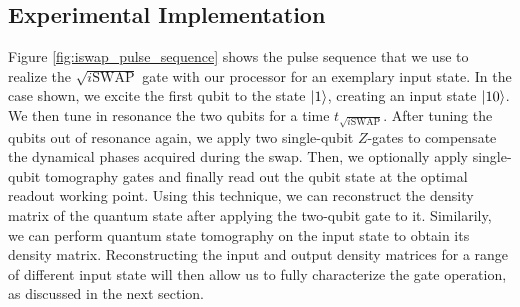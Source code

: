 \subsection{Experimental Implementation}

Figure \ref{fig:iswap_pulse_sequence} shows the pulse sequence that we use to realize the $\sqrt{i\mathrm{SWAP}}$ gate with our processor for an exemplary input state. In the case shown, we excite the first qubit to the state $\left| 1 \right>$, creating an input state $\left| 10 \right>$. We then tune in resonance the two qubits for a time $t_{\sqrt{i\mathrm{SWAP}}}$. After tuning the qubits out of resonance again, we apply two single-qubit $Z$-gates to compensate the dynamical phases acquired during the swap. Then, we optionally apply single-qubit tomography gates and finally read out the qubit state at the optimal readout working point. Using this technique, we can reconstruct the density matrix of the quantum state after applying the two-qubit gate to it. Similarily, we can perform quantum state tomography on the input state to obtain its density matrix. Reconstructing the input and output density matrices for a range of different input state will then allow us to fully characterize the gate operation, as discussed in the next section.

